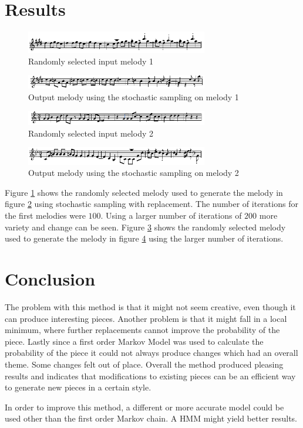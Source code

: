 \section{Results}
\begin{figure}[h!]
\centerline{\includegraphics[width=300px]{../images/swr_in.pdf}}
\caption{Randomly selected input melody 1}
\label{ims:swr_in}
\end{figure}

\begin{figure}[h!]
\centerline{\includegraphics[width=300px]{../images/swr_out.pdf}}
\caption{Output melody using the stochastic sampling on melody 1}
\label{ims:swr_out}
\end{figure}

\begin{figure}[h!]
\centerline{\includegraphics[width=300px]{../images/swr_in2.pdf}}
\caption{Randomly selected input melody 2}
\label{ims:swr_in2}
\end{figure}

\begin{figure}[h!]
\centerline{\includegraphics[width=300px]{../images/swr_out2.pdf}}
\caption{Output melody using the stochastic sampling on melody 2}
\label{ims:swr_out2}
\end{figure}

Figure \ref{ims:swr_in} shows the randomly selected melody used to generate the melody in figure \ref{ims:swr_out} using stochastic sampling with replacement. The number of iterations for the first melodies were $100$.
Using a larger number of iterations of $200$ more variety and change can be seen. Figure \ref{ims:swr_in2} shows the randomly selected melody used to generate the melody in figure \ref{ims:swr_out2} using the larger number of iterations.


\section{Conclusion}
The problem with this method is that it might not seem creative, even though it can produce interesting pieces. Another problem is that it might fall in a local minimum, where further replacements cannot improve the probability of the piece. Lastly since a first order Markov Model was used to calculate the probability of the piece it could not always produce changes which had an overall theme. Some changes felt out of place.
Overall the method produced pleasing results and indicates that modifications to existing pieces can be an efficient way to generate new pieces in a certain style.

In order to improve this method, a different or more accurate model could be used other than the first order Markov chain. A \ac{HMM} might yield better results.